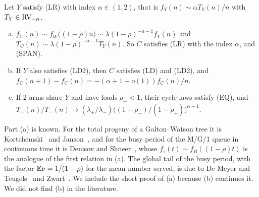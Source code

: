 \begin{proposition}\label{prop:cycle}
Let $Y$ satisfy (LR) with index $\alpha\in(1,2)$, that is $f_Y(n)\sim\alpha T_Y(n)/n$ with
$T_Y\in\mathrm{RV}_{-\alpha}$.
\begin{enumerate}[(a)]
\item $f_C(n)\sim f_W\bigl((1-\rho)n\bigr)\sim\lambda(1-\rho)^{-\alpha-1}f_Y(n)$ and
$T_C(n)\sim\lambda(1-\rho)^{-\alpha-1}T_Y(n)$. So $C$ satisfies (LR) with the index $\alpha$,
and (SPAN).
\item If $Y$ also satisfies (LD2), then $C$ satisfies (LD) and (LD2), and
$f_C(n+1)-f_C(n)=-(\alpha+1+o(1))f_C(n)/n$.
\item If 2 arms share $Y$ and have loads $\rho_\pm<1$, their cycle laws satisfy (EQ), and
$T_\plus(n)/T_\minus(n)\to(\lambda_\plus/\lambda_\minus)\bigl((1-\rho_\minus)/(1-\rho_\plus)\bigr)^{\alpha+1}$.
\end{enumerate}
\end{proposition}

Part (a) is known. For the total progeny of a Galton--Watson tree it is
Kortchemski~\cite[Eq.~(14)]{kortchemski2015} and Janson~\cite[Remark~18.34]{janson2012}, and
for the busy period of the M/G/1 queue in continuous time it is Denisov and
Shneer~\cite[Corollary~2.2]{denisovshneer2010}, whose $f_\tau(t)\sim f_B((1-\rho)t)$ is the
analogue of the first relation in (a). The global tail of the busy period, with the factor
$\mathbb{E}\nu=1/(1-\rho)$ for the mean number served, is due to De Meyer and
Teugels~\cite{demeyerteugels1980} and Zwart~\cite{zwart2001}. We include the short proof of (a)
because (b) continues it. We did not find (b) in the literature.

